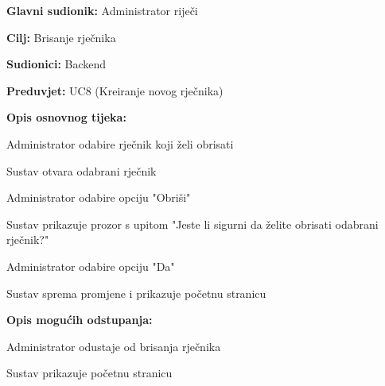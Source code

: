 						\noindent {}
					\begin{packed_item}
						
						\item \textbf{Glavni sudionik: } Administrator riječi
						\item  \textbf{Cilj:} Brisanje rječnika
						\item  \textbf{Sudionici:} Backend
						\item  \textbf{Preduvjet:} UC8 (Kreiranje novog rječnika)
						\item  \textbf{Opis osnovnog tijeka:}
						
						\item[] \begin{packed_enum}
							
							\item Administrator odabire rječnik koji želi obrisati
							\item Sustav otvara odabrani rječnik
							\item Administrator odabire opciju "Obriši"
							\item Sustav prikazuje prozor s upitom "Jeste li sigurni da želite obrisati odabrani rječnik?"
							\item Administrator odabire opciju "Da"
							\item Sustav sprema promjene i prikazuje početnu stranicu
							
						\end{packed_enum}
						
						\item  \textbf{Opis mogućih odstupanja:}
						
						\item[] \begin{packed_item}
							
							
							\item[4.a] Administrator odustaje od brisanja rječnika
							\item[] \begin{packed_enum}
								
								\item Sustav prikazuje početnu stranicu
								
							\end{packed_enum}
						\end{packed_item}
					\end{packed_item}
					
